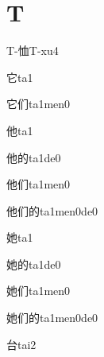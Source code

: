 ﻿%
\section*{T}

\begin{verbete}[9]{T-恤}{T-xu4}
\end{verbete}

\begin{verbete}[5]{它}{ta1}
\end{verbete}

\begin{verbete}[5;5]{它们}{ta1men0}
\end{verbete}

\begin{verbete}[5]{他}{ta1}
\end{verbete}

\begin{verbete}[5;8]{他的}{ta1de0}
\end{verbete}

\begin{verbete}[5;5]{他们}{ta1men0}
\end{verbete}

\begin{verbete}[5;5;8]{他们的}{ta1men0de0}
\end{verbete}

\begin{verbete}[6]{她}{ta1}
\end{verbete}

\begin{verbete}[6;8]{她的}{ta1de0}
\end{verbete}

\begin{verbete}[6;5]{她们}{ta1men0}
\end{verbete}

\begin{verbete}[6;5;8]{她们的}{ta1men0de0}
\end{verbete}

\begin{verbete}[5]{台}{tai2}
\end{verbete}

